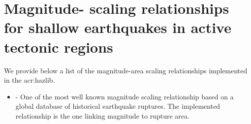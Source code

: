 \label{sec:msr_list}

\section[Relationships for shallow earthquakes in active tectonic regions]{Magnitude-
scaling relationships for shallow earthquakes in active tectonic regions}
We provide below a list of the magnitude-area scaling relationships 
implemented in the \gls{acr:hazlib}. 
\begin{itemize} 
    \item \cite{wells1994} - One of the most well known magnitude scaling
        relationship based on a global database of historical earthquake 
        ruptures. The implemented relationship is the one linking magnitude 
        to rupture area.
\end{itemize}
%
%
